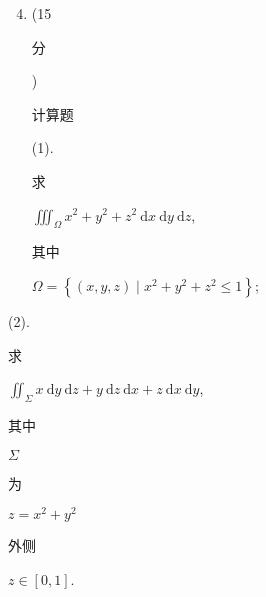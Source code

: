\documentclass[10pt]{article}
\begin{document}
\begin{enumerate}
  \setcounter{enumi}{3}
  \item (15 \begin{CJK}{UTF8}{mj}分\end{CJK}) \begin{CJK}{UTF8}{mj}计算题\end{CJK} (1). \begin{CJK}{UTF8}{mj}求\end{CJK} $\iiint_{\Omega} x^{2}+y^{2}+z^{2} \mathrm{~d} x \mathrm{~d} y \mathrm{~d} z$, \begin{CJK}{UTF8}{mj}其中\end{CJK} $\Omega=\left\{(x, y, z) \mid x^{2}+y^{2}+z^{2} \leq 1\right\}$;
\end{enumerate}
(2). \begin{CJK}{UTF8}{mj}求\end{CJK} $\iint_{\Sigma} x \mathrm{~d} y \mathrm{~d} z+y \mathrm{~d} z \mathrm{~d} x+z \mathrm{~d} x \mathrm{~d} y$, \begin{CJK}{UTF8}{mj}其中\end{CJK} $\Sigma$ \begin{CJK}{UTF8}{mj}为\end{CJK} $z=x^{2}+y^{2}$ \begin{CJK}{UTF8}{mj}外侧\end{CJK} $z \in[0,1]$.
\end{document}
